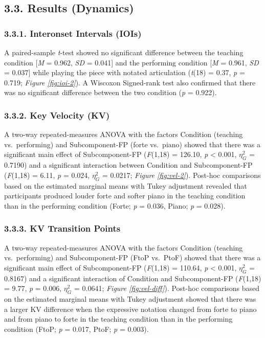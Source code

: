 \documentclass[
  english,
  man,floatsintext]{apa6}
\begin{document}
\hypertarget{results-dynamics-1}{%
\subsection{3.3. Results (Dynamics)}\label{results-dynamics-1}}

\hypertarget{interonset-intervals-iois-3}{%
\subsubsection{3.3.1. Interonset Intervals (IOIs)}\label{interonset-intervals-iois-3}}

A paired-sample \emph{t}-test showed no significant difference between the teaching condition {[}\emph{M} = 0.962, \emph{SD} = 0.041{]} and the performing condition {[}\emph{M} = 0.961, \emph{SD} = 0.037{]} while playing the piece with notated articulation (\emph{t}(18) = 0.37, \emph{p} = 0.719; \emph{Figure \ref{fig:ioi-2}}). A Wiscoxon Signed-rank test also confirmed that there was no significant difference between the two condition (\emph{p} = 0.922).

\hypertarget{key-velocity-kv-3}{%
\subsubsection{3.3.2. Key Velocity (KV)}\label{key-velocity-kv-3}}

A two-way repeated-measures ANOVA with the factors Condition (teaching vs.~performing) and Subcomponent-FP (forte vs.~piano) showed that there was a significant main effect of Subcomponent-FP (\emph{F}(1,18) = 126.10, \emph{p} \textless{} 0.001, \(\eta_G^2\) = 0.7190) and a significant interaction between Condition and Subcomponent-FP (\emph{F}(1,18) = 6.11, \emph{p} = 0.024, \(\eta_G^2\) = 0.0217; \emph{Figure \ref{fig:vel-2}}). Post-hoc comparisons based on the estimated marginal means with Tukey adjustment revealed that participants produced louder forte and softer piano in the teaching condition than in the performing condition (Forte; \emph{p} = 0.036, Piano; \emph{p} = 0.028).

\hypertarget{kv-transition-points-1}{%
\subsubsection{3.3.3. KV Transition Points}\label{kv-transition-points-1}}

A two-way repeated-measures ANOVA with the factors Condition (teaching vs.~performing) and Subcomponent-FP (FtoP vs.~PtoF) showed that there was a significant main effect of Subcomponent-FP (\emph{F}(1,18) = 110.64, \emph{p} \textless{} 0.001, \(\eta_G^2\) = 0.8167) and a significant interaction of Condition and Subcomponent-FP (\emph{F}(1,18) = 9.77, \emph{p} = 0.006, \(\eta_G^2\) = 0.0641; \emph{Figure \ref{fig:vel-diff}}). Post-hoc comparisons based on the estimated marginal means with Tukey adjustment showed that there was a larger KV difference when the expressive notation changed from forte to piano and from piano to forte in the teaching condition than in the performing condition (FtoP; \emph{p} = 0.017, PtoF; \emph{p} = 0.003).
\end{document}
